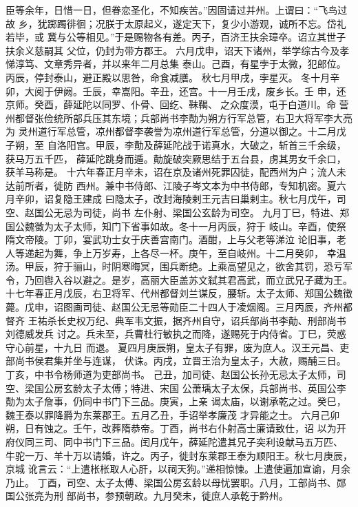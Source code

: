 \documentclass[12pt,UTF8]{ctexbook}
\begin{document}
臣等余年，日惜一日，但眷恋圣化，不知疾苦。”因固请过并州。上谓曰：“飞鸟过故
乡，犹踯躅徘徊；况朕于太原起义，遂定天下，复少小游观，诚所不忘。岱礼若毕，或
冀与公等相见。”于是赐物各有差。丙子，百济王扶余璋卒。诏立其世子扶余义慈嗣其
父位，仍封为带方郡王。
六月戊申，诏天下诸州，举学综古今及孝悌淳笃、文章秀异者，并以来年二月总集
泰山。己酉，有星孛于太微，犯郎位。丙辰，停封泰山，避正殿以思咎，命食减膳。
秋七月甲戌，孛星灭。
冬十月辛卯，大阅于伊阙。壬辰，幸嵩阳。辛丑，还宫。十一月壬戌，废乡长。壬
申，还京师。癸酉，薛延陀以同罗、仆骨、回纥、靺鞨、之众度漠，屯于白道川。命
营州都督张俭统所部兵压其东境；兵部尚书李勣为朔方行军总管，右卫大将军李大亮为
灵州道行军总管，凉州都督李袭誉为凉州道行军总管，分道以御之。十二月戊子朔，至
自洛阳宫。甲辰，李勣及薛延陀战于诺真水，大破之，斩首三千余级，获马万五千匹，
薛延陀跳身而遁。勣旋破突厥思结于五台县，虏其男女千余口，获羊马称是。
十六年春正月辛未，诏在京及诸州死罪囚徒，配西州为户；流人未达前所者，徙防
西州。兼中书侍郎、江陵子岑文本为中书侍郎，专知机密。夏六月辛卯，诏复隐王建成
曰隐太子，改封海陵剌王元吉曰巢剌主。秋七月戊午，司空、赵国公无忌为司徒，尚书
左仆射、梁国公玄龄为司空。
九月丁巳，特进、郑国公魏徵为太子太师，知门下省事如故。冬十一月丙辰，狩于
岐山。辛酉，使祭隋文帝陵。丁卯，宴武功士女于庆善宫南门。酒酣，上与父老等涕泣
论旧事，老人等递起为舞，争上万岁寿，上各尽一杯。庚午，至自岐州。十二月癸卯，
幸温汤。甲辰，狩于骊山，时阴寒晦冥，围兵断绝。上乘高望见之，欲舍其罚，恐亏军
令，乃回辔入谷以避之。是岁，高丽大臣盖苏文弑其君高武，而立武兄子藏为王。
十七年春正月戊辰，右卫将军、代州都督刘兰谋反，腰斩。太子太师、郑国公魏徵
薨。戊申，诏图画司徒、赵国公无忌等勋臣二十四人于凌烟阁。三月丙辰，齐州都督齐
王祐杀长史权万纪、典军韦文振，据齐州自守，诏兵部尚书李勣、刑部尚书刘德威发兵
讨之。兵未至，兵曹杜行敏执之而降，遂赐死于内侍省。丁巳，荧惑守心前星，十九日
而退。
夏四月庚辰朔，皇太子有罪，废为庶人。汉王元昌、吏部尚书侯君集并坐与连谋，
伏诛。丙戌，立晋王治为皇太子，大赦，赐酺三日。丁亥，中书令杨师道为吏部尚书。
己丑，加司徒、赵国公长孙无忌太子太师，司空、梁国公房玄龄太子太傅；特进、宋国
公萧瑀太子太保，兵部尚书、英国公李勣为太子詹事，仍同中书门下三品。庚寅，上亲
谒太庙，以谢承乾之过。癸巳，魏王泰以罪降爵为东莱郡王。五月乙丑，手诏举孝廉茂
才异能之士。
六月己卯朔，日有蚀之。壬午，改葬隋恭帝。丁酉，尚书右仆射高士廉请致仕，诏
以为开府仪同三司、同中书门下三品。闰月戊午，薛延陀遣其兄子突利设献马五万匹、
牛驼一万、羊十万以请婚，许之。丙子，徙封东莱郡王泰为顺阳王。秋七月庚辰，京城
讹言云：“上遣枨枨取人心肝，以祠天狗。”递相惊悚。上遣使遍加宣谕，月余乃止。
丁酉，司空、太子太傅、梁国公房玄龄以母忧罢职。八月，工部尚书、郧国公张亮为刑
部尚书，参预朝政。九月癸未，徙庶人承乾于黔州。
\end{document}
